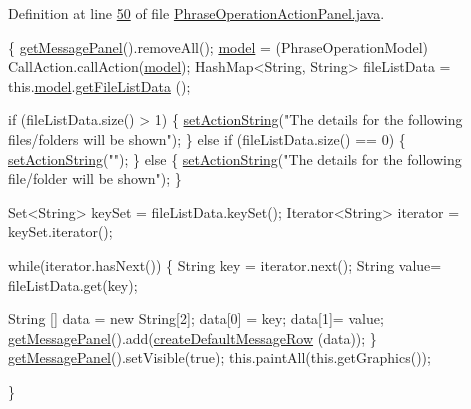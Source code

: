 Definition at line \hyperlink{L50}{50} of file \hyperlink{}{Phrase\-Operation\-Action\-Panel.\-java}.


\begin{DoxyCode}
                                  \{
        \hyperlink{classcom_1_1poly_1_1nlp_1_1filekommander_1_1views_1_1panels_1_1_abstract_message_panel_a2d8c613b03cb000425ae32a9a44dc805}{getMessagePanel}().removeAll();
        \hyperlink{classcom_1_1poly_1_1nlp_1_1filekommander_1_1views_1_1panels_1_1_phrase_operation_action_panel_ac8380b5cb091933bcb138d4b7471d3c1}{model} = (PhraseOperationModel) CallAction.callAction(\hyperlink{classcom_1_1poly_1_1nlp_1_1filekommander_1_1views_1_1panels_1_1_phrase_operation_action_panel_ac8380b5cb091933bcb138d4b7471d3c1}{model});
        HashMap<String, String> fileListData = this.\hyperlink{classcom_1_1poly_1_1nlp_1_1filekommander_1_1views_1_1panels_1_1_phrase_operation_action_panel_ac8380b5cb091933bcb138d4b7471d3c1}{model}.\hyperlink{classcom_1_1poly_1_1nlp_1_1filekommander_1_1views_1_1models_1_1_phrase_operation_model_a80fd6066949ef4eabf1a4c0749afc364}{getFileListData}
      ();
        
        \textcolor{keywordflow}{if} (fileListData.size() > 1) \{
            \hyperlink{classcom_1_1poly_1_1nlp_1_1filekommander_1_1views_1_1panels_1_1_abstract_message_panel_a565a70e35ba8533880099438337eea08}{setActionString}(\textcolor{stringliteral}{"The details for the following
       files/folders will be shown"});
        \} \textcolor{keywordflow}{else} \textcolor{keywordflow}{if} (fileListData.size() == 0) \{
            \hyperlink{classcom_1_1poly_1_1nlp_1_1filekommander_1_1views_1_1panels_1_1_abstract_message_panel_a565a70e35ba8533880099438337eea08}{setActionString}(\textcolor{stringliteral}{""});
        \} \textcolor{keywordflow}{else} \{
            \hyperlink{classcom_1_1poly_1_1nlp_1_1filekommander_1_1views_1_1panels_1_1_abstract_message_panel_a565a70e35ba8533880099438337eea08}{setActionString}(\textcolor{stringliteral}{"The details for the following
       file/folder will be shown"});
        \}
        
        Set<String> keySet = fileListData.keySet();
        Iterator<String> iterator = keySet.iterator();
        
        \textcolor{keywordflow}{while}(iterator.hasNext())
        \{   
            String key = iterator.next();
            String value= fileListData.get(key);
            
            String [] data = \textcolor{keyword}{new} String[2];
            data[0] = key;
            data[1]= value;
            \hyperlink{classcom_1_1poly_1_1nlp_1_1filekommander_1_1views_1_1panels_1_1_abstract_message_panel_a2d8c613b03cb000425ae32a9a44dc805}{getMessagePanel}().add(\hyperlink{classcom_1_1poly_1_1nlp_1_1filekommander_1_1views_1_1panels_1_1_abstract_message_panel_aa28d1e99f183f68a2e9ecc75d9292981}{createDefaultMessageRow}
      (data));
        \}
        \hyperlink{classcom_1_1poly_1_1nlp_1_1filekommander_1_1views_1_1panels_1_1_abstract_message_panel_a2d8c613b03cb000425ae32a9a44dc805}{getMessagePanel}().setVisible(\textcolor{keyword}{true});
        this.paintAll(this.getGraphics());      

    \}
\end{DoxyCode}
